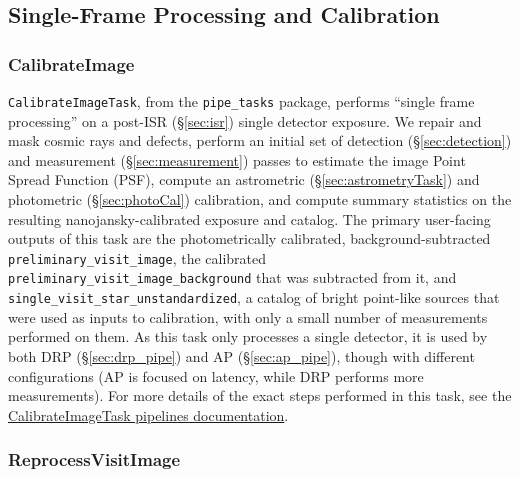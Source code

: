 \subsection{Single-Frame Processing and Calibration}

\subsubsection{CalibrateImage}
\label{sec:CalibrateImage}

\texttt{CalibrateImageTask}, from the \texttt{pipe\_tasks} package, performs ``single frame processing'' on a post-ISR (\S\ref{sec:isr}) single detector exposure.
We repair and mask cosmic rays and defects, perform an initial set of detection (\S\ref{sec:detection}) and measurement (\S\ref{sec:measurement}) passes to estimate the image Point Spread Function (PSF), compute an astrometric (\S\ref{sec:astrometryTask}) and photometric (\S\ref{sec:photoCal}) calibration, and compute summary statistics on the resulting nanojansky-calibrated exposure and catalog.
The primary user-facing outputs of this task are the photometrically calibrated, background-subtracted \texttt{preliminary\_visit\_image}, the calibrated \texttt{preliminary\_visit\_image\_background} that was subtracted from it, and \texttt{single\_visit\_star\_unstandardized}, a catalog of bright point-like sources that were used as inputs to calibration, with only a small number of measurements performed on them.
As this task only processes a single detector, it is used by both DRP (\S\ref{sec:drp_pipe}) and AP (\S\ref{sec:ap_pipe}), though with different configurations (AP is focused on latency, while DRP performs more measurements).
For more details of the exact steps performed in this task, see the \href{https://pipelines.lsst.io/v/daily/modules/lsst.pipe.tasks/tasks/lsst.pipe.tasks.calibrateImage.CalibrateImageTask.html}{CalibrateImageTask pipelines documentation}.

\subsubsection{ReprocessVisitImage}
\label{sec:ReprocessVisitImage}

